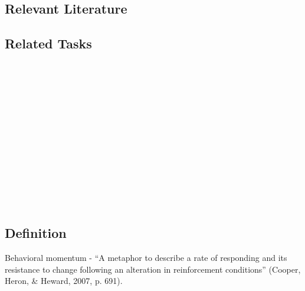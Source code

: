 \subsection{Relevant Literature}
\begin{refsection}
\nocite{test,alang2017police,clayton2018black}
\printbibliography[heading=none]
\end{refsection}
%
\subsection{Related Tasks}
\fourcOne{}\\
\fourcTwo{}\\
\fourdOne{}\\\
\fourdTwo{}\\\
\fourdFifteen{}\\
\fourdSixteen{}\\
\fourdSeventeen{}\\
\fourdNineteen{}\\
\foureSeven{}\\
\fourFKEighteen{}\\
\fourFKTwenty{}\\
\fourFKTwentyOne{}\\
%
%
%
%
%
%
\section{\fourFKThirtyNine{}}
\subsection{Definition}
Behavioral momentum - ``A metaphor to describe a rate of responding and its resistance to change following an alteration in reinforcement conditions'' (Cooper, Heron, \& Heward, 2007, p. 691).\\


